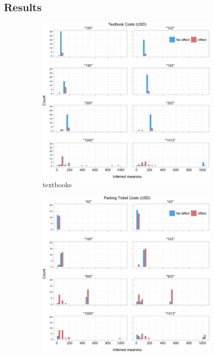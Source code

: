 \documentclass{article} %
\begin{document}
\subsection{Results}
\begin{figure}
        \begin{subfigure}[b]{0.5\textwidth}
                \centering
		\includegraphics[width=\textwidth]{humans_all_textbook.png}
		\caption{textbooks}
	\end{subfigure}
        \begin{subfigure}[b]{0.5\textwidth}
                \centering
                \includegraphics[width=\textwidth]{humans_all_ticket.png}

\end{subfigure}
\end{figure}
\end{document}
